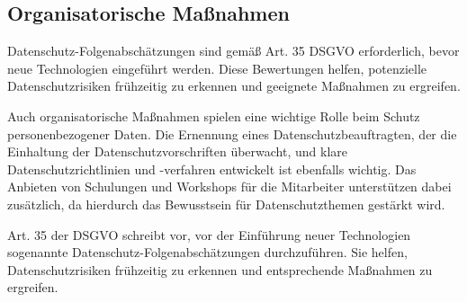 \cite{conrad_2017}

\subsection{Organisatorische Maßnahmen}

Datenschutz-Folgenabschätzungen sind gemäß Art. 35 DSGVO erforderlich,
bevor neue Technologien eingeführt werden. Diese Bewertungen helfen, potenzielle
Datenschutzrisiken frühzeitig zu erkennen und geeignete Maßnahmen zu ergreifen.

Auch organisatorische Maßnahmen spielen eine wichtige Rolle beim Schutz
personenbezogener Daten. Die Ernennung eines Datenschutzbeauftragten, der die
Einhaltung der Datenschutzvorschriften überwacht, und klare
Datenschutzrichtlinien und -verfahren entwickelt ist ebenfalls wichtig. Das
Anbieten von Schulungen und Workshops für die Mitarbeiter unterstützen dabei
zusätzlich, da hierdurch das Bewusstsein für Datenschutzthemen gestärkt wird.

Art. 35 der DSGVO schreibt vor, vor der Einführung neuer Technologien sogenannte
Datenschutz-Folgenabschätzungen durchzuführen. Sie helfen, Datenschutzrisiken
frühzeitig zu erkennen und entsprechende Maßnahmen zu ergreifen.

\cite{conrad_2017}